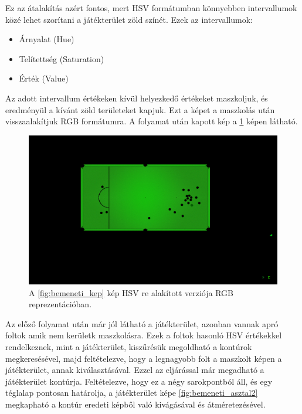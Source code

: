 \par Ez az átalakítás azért fontos, mert HSV formátumban könnyebben intervallumok közé lehet szorítani a játékterület zöld színét.
\newline Ezek az intervallumok:
\begin{itemize}
    \setlength\itemsep{-2pt}
    \item Árnyalat (Hue)
    \item Telítettség (Saturation)
    \item Érték (Value)
\end{itemize}
\par Az adott intervallum értékeken kívül helyezkedő értékeket maszkoljuk, és eredményül a kívánt zöld területeket kapjuk. Ezt a képet a maszkolás után visszaalakítjuk RGB formátumra. A folyamat után kapott kép a \ref{fig:bemeneti_kep_mask} képen látható.

\begin{figure}[!ht]
    \centering
    \includegraphics[width=150mm, keepaspectratio]{figures/input_screen_mask.png}
    \caption{A \ref{fig:bemeneti_kep} kép HSV re alakított verziója RGB reprezentációban.}
    \label{fig:bemeneti_kep_mask}
\end{figure}

\par Az előző folyamat után már jól látható a játékterület, azonban vannak apró foltok amik nem kerületk maszkolásra. Ezek a foltok hasonló HSV értékekkel rendelkeznek, mint a játékterület, kiszűrésük megoldható a kontúrok megkeresésével, majd feltételezve, hogy a legnagyobb folt a maszkolt képen a játékterület, annak kiválasztásával. Ezzel az eljárással már megadható a játékterület kontúrja. Feltételezve, hogy ez a négy sarokpontból áll, és egy téglalap pontosan határolja, a játékterület képe \ref{fig:bemeneti_asztal2} megkapható a kontúr eredeti képből való kivágásával és átméretezésével.

